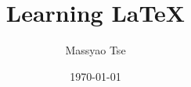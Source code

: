 \documentclass{article}
\begin{document}
\author{Massyao Tse}
\title{Learning \LaTeX{}}
\date{\today{}} %

\maketitle{} %

\tableofcontents{} %




\end{document}
